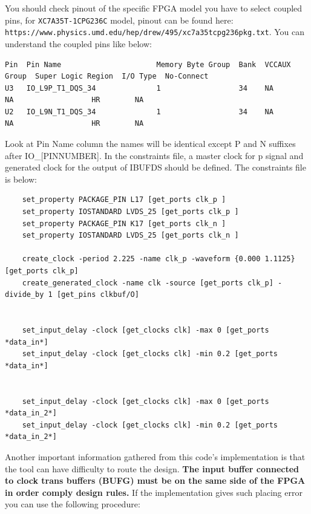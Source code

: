 \documentclass{report}
\begin{document}
You should check pinout of the specific FPGA model you have to select coupled pins, for \texttt{XC7A35T-1CPG236C} model, pinout can be found here: \texttt{https://www.physics.umd.edu/hep/drew/495/xc7a35tcpg236pkg.txt}. You can understand the coupled pins like below:
\begin{verbatim}
Pin  Pin Name                      Memory Byte Group  Bank  VCCAUX Group  Super Logic Region  I/O Type  No-Connect
U3   IO_L9P_T1_DQS_34              1                  34    NA            NA                  HR        NA
U2   IO_L9N_T1_DQS_34              1                  34    NA            NA                  HR        NA
\end{verbatim}
Look at Pin Name column the names will be identical except P and N suffixes after IO\_[PINNUMBER].
In the constraints file, a master clock for p signal and generated clock for the output of IBUFDS should be defined. The constraints file is below:
\begin{verbatim}
    set_property PACKAGE_PIN L17 [get_ports clk_p ]                    
    set_property IOSTANDARD LVDS_25 [get_ports clk_p ]
    set_property PACKAGE_PIN K17 [get_ports clk_n ]                    
    set_property IOSTANDARD LVDS_25 [get_ports clk_n ]
    
    create_clock -period 2.225 -name clk_p -waveform {0.000 1.1125} [get_ports clk_p]
    create_generated_clock -name clk -source [get_ports clk_p] -divide_by 1 [get_pins clkbuf/O]
    
    
    set_input_delay -clock [get_clocks clk] -max 0 [get_ports *data_in*]
    set_input_delay -clock [get_clocks clk] -min 0.2 [get_ports *data_in*]
    
    
    set_input_delay -clock [get_clocks clk] -max 0 [get_ports *data_in_2*]
    set_input_delay -clock [get_clocks clk] -min 0.2 [get_ports *data_in_2*]
\end{verbatim}

Another important information gathered from this code's implementation is that the tool can have difficulty to route the design. \textbf{The input buffer connected to clock trans buffers (BUFG) must be on the same side of the FPGA in order comply design rules.} 
If the implementation gives such placing error you can use the following procedure:
\end{document}
